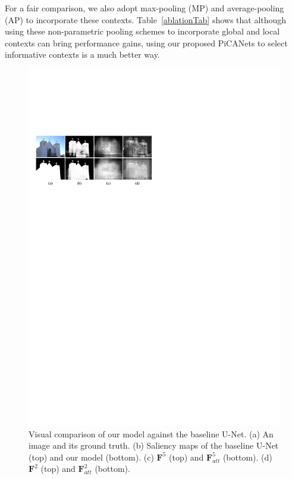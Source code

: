 \documentclass[10pt,twocolumn,letterpaper]{article}
\begin{document}
For a fair comparison, we also adopt max-pooling (MP) and average-pooling (AP) to incorporate these contexts. Table~\ref{ablationTab} shows that although using these non-parametric pooling schemes to incorporate global and local contexts can bring performance gains, using our proposed PiCANets to select informative contexts is a much better way.

\begin{figure}[!ht]
  \graphicspath{{Figures/baselinCmp/}}
  \centering
  \includegraphics[width=1\linewidth]{baselineCmp.pdf}
  \caption{Visual comparison of our model against the baseline U-Net. (a) An image and its ground truth. (b) Saliency maps of the baseline U-Net (top) and our model (bottom). (c) $\bm{F}^5$ (top) and $\bm{F}_{att}^5$ (bottom). (d) $\bm{F}^2$ (top) and $\bm{F}_{att}^2$ (bottom).}
  \label{baselinCmp}
  \vspace{-0.3cm}
\end{figure}
\end{document}
